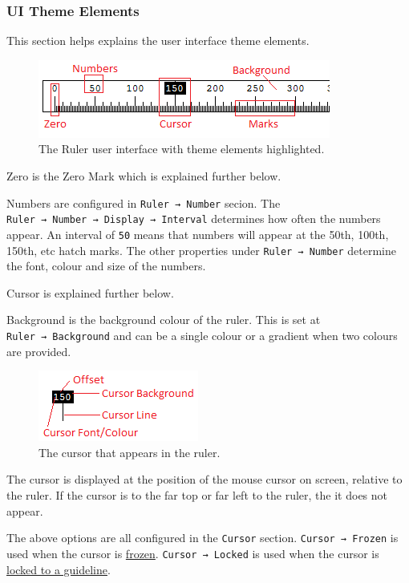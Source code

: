 \documentclass[
]{book}
\begin{document}
\subsubsection{UI Theme Elements}\label{ui-theme-elements}

This section helps explains the user interface theme elements.

\begin{figure}
\centering
\includegraphics{images/ruler-theme.png}
\caption{\label{fig:unnamed-chunk-8}The Ruler user interface with theme elements highlighted.}
\end{figure}

Zero is the Zero Mark which is explained further below.

Numbers are configured in \texttt{Ruler\ →\ Number} secion.
The \texttt{Ruler\ →\ Number\ →\ Display\ →\ Interval} determines how often the numbers appear.
An interval of \texttt{50} means that numbers will appear at the 50th, 100th, 150th, etc hatch marks.
The other properties under \texttt{Ruler\ →\ Number} determine the font, colour and size of the numbers.

Cursor is explained further below.

Background is the background colour of the ruler.
This is set at \texttt{Ruler\ →\ Background} and can be a single colour or a gradient when two colours are provided.

\begin{figure}
\centering
\includegraphics{images/ruler-cursor.png}
\caption{\label{fig:unnamed-chunk-9}The cursor that appears in the ruler.}
\end{figure}

The cursor is displayed at the position of the mouse cursor on screen, relative to the ruler.
If the cursor is to the far top or far left to the ruler, the it does not appear.

The above options are all configured in the \texttt{Cursor} section.
\texttt{Cursor\ →\ Frozen} is used when the cursor is \hyperref[freezing-the-cursor]{frozen}.
\texttt{Cursor\ →\ Locked} is used when the cursor is \hyperref[locking-to-guidelines]{locked to a guideline}.
\end{document}
